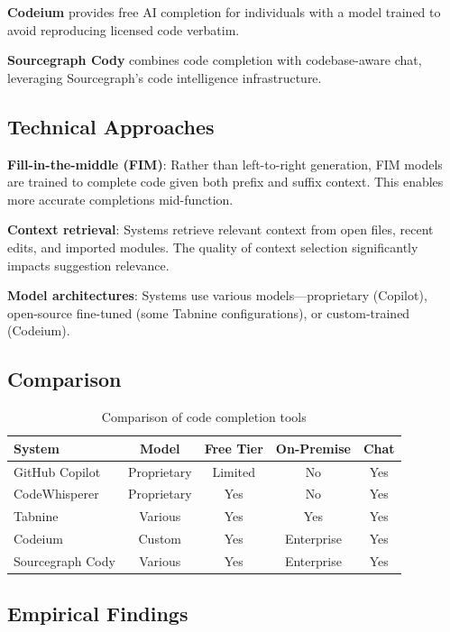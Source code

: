 \textbf{Codeium} provides free AI completion for individuals with a model trained to avoid reproducing licensed code verbatim.

\textbf{Sourcegraph Cody} combines code completion with codebase-aware chat, leveraging Sourcegraph's code intelligence infrastructure.

\subsection{Technical Approaches}

\textbf{Fill-in-the-middle (FIM)}: Rather than left-to-right generation, FIM models are trained to complete code given both prefix and suffix context. This enables more accurate completions mid-function.

\textbf{Context retrieval}: Systems retrieve relevant context from open files, recent edits, and imported modules. The quality of context selection significantly impacts suggestion relevance.

\textbf{Model architectures}: Systems use various models---proprietary (Copilot), open-source fine-tuned (some Tabnine configurations), or custom-trained (Codeium).

\subsection{Comparison}

\begin{table}[h]
\centering
\caption{Comparison of code completion tools}
\label{tab:completion}
\begin{tabular}{lcccc}
\toprule
\textbf{System} & \textbf{Model} & \textbf{Free Tier} & \textbf{On-Premise} & \textbf{Chat} \\
\midrule
GitHub Copilot & Proprietary & Limited & No & Yes \\
CodeWhisperer & Proprietary & Yes & No & Yes \\
Tabnine & Various & Yes & Yes & Yes \\
Codeium & Custom & Yes & Enterprise & Yes \\
Sourcegraph Cody & Various & Yes & Enterprise & Yes \\
\bottomrule
\end{tabular}
\end{table}

\subsection{Empirical Findings}

